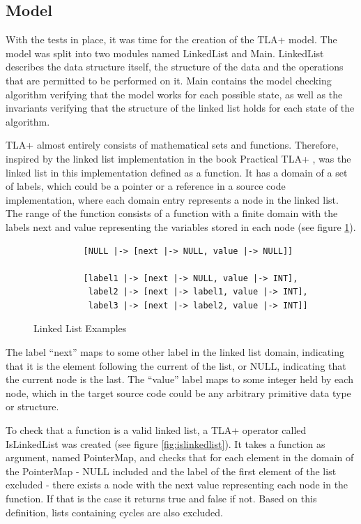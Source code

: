 \subsection{Model}

With the tests in place, it was time for the creation of the TLA+ model. The model was split into two modules named LinkedList and Main. LinkedList describes the data structure itself, the structure of the data and the operations that are permitted to be performed on it. Main contains the model checking algorithm verifying that the model works for each possible state,  as well as the invariants verifying that the structure of the linked list holds for each state of the algorithm.

TLA+ almost entirely consists of mathematical sets and functions. Therefore, inspired by the linked list implementation in the book Practical TLA+ \cite{PRACTICALTLA}, was the linked list in this implementation defined as a function. It has a domain of a set of labels, which could be a pointer or a reference in a source code implementation, where each domain entry represents a node in the linked list. The range of the function consists of a function with a finite domain with the labels next and value representing the variables stored in each node (see figure \ref{fig:linkedlists}). 


\begin{figure}[H]
 \vspace{12pt}
\begin{verbatim}
          [NULL |-> [next |-> NULL, value |-> NULL]]
        
          [label1 |-> [next |-> NULL, value |-> INT], 
           label2 |-> [next |-> label1, value |-> INT],
           label3 |-> [next |-> label2, value |-> INT]]
\end{verbatim}
    \centering
    \caption{Linked List Examples}
    \label{fig:linkedlists}
\end{figure}


The label “next” maps to some other label in the linked list domain, indicating that it is the element following the current of the list, or NULL, indicating that the current node is the last. The “value” label maps to some integer held by each node, which in the target source code could be any arbitrary primitive data type or structure.

To check that a function is a valid linked list, a TLA+ operator called IsLinkedList was created (see figure \ref{fig:islinkedlist}). It takes a function as argument, named PointerMap, and checks that for each element in the domain of the PointerMap - NULL included and the label of the first element of the list excluded - there exists a node with the next value representing each node in the function. If that is the case it returns true and false if not. Based on this definition, lists containing cycles are also excluded.

